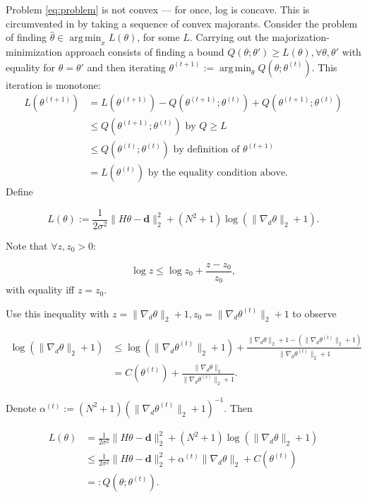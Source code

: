 \documentclass[paper=a4, fontsize=11pt]{scrartcl} %
\DeclareMathOperator*{\argmin}{arg\,min}
\numberwithin{equation}{section} %
\numberwithin{figure}{section} %
\numberwithin{table}{section} %
\newcommand{\data}{\mathbf{d}}
\newcommand{\param}{\theta}
\newcommand{\grad}{\nabla_{d} }
\begin{document}
Problem \eqref{eq:problem} is not convex --- for once, log is concave.
This is circumvented in \cite{oliveira2009adaptive} by taking a
sequence of convex majorants.  Consider the problem of finding
$\hat{\param} \in \argmin_{x} L(\param)$, for some $L$. Carrying out
the majorization-minimization approach consists of finding a bound
$Q(\param; \param') \geq L(\param), \forall \param,\param'$ with
equality for $\param=\param'$ and then iterating $\param^{(t+1)} :=
\argmin_{\param} Q(\param;\param^{(t)})$. This iteration is monotone:
\begin{align*}
  L(\param^{(t+1)}) &= L(\param^{(t+1)}) - Q(\param^{(t+1)}; \param^{(t)}) + Q(\param^{(t+1)}; \param^{(t)})\\
  &\leq  Q(\param^{(t+1)}; \param^{(t)}) \text{ by } Q \geq L \\
  & \leq Q(\param^{(t)} ;\param^{(t)}) \text{ by definition of } \param^{(t+1)} \\
  &= L(\param^{(t)}) \text{ by the equality condition above. }
\end{align*}
Define 

$$
L(\param) :=\frac{1}{2\sigma^2} \|H\param - \data\|_2^2 + (N^2 + 1) \log (\|\grad\param\|_2 + 1).
$$

Note that $\forall z,z_0 > 0$:

$$
\log z \leq \log z_0 + \frac{z-z_0}{z_0},
$$ 
with equality iff $z = z_0$.

Use this inequality with $z = \|\grad\param\|_2 + 1, z_0 = \|\grad
\param^{(t)}\|_2 + 1$ to observe

\begin{align*}
  \log (\|\grad\param\|_2 + 1) &\leq \log( \|\grad \param^{(t)}\|_2 + 1 ) + 
  \frac{ \|\grad \param\|_2 + 1 - (\|\grad \param^{(t)}\|_2 + 1)}{\|\grad \param^{(t)}\|_2 + 1} \\
  &= C(\param^{(t)}) + \frac{ \|\grad \param\|_2 }{\|\grad \param^{(t)}\|_2 + 1}.
\end{align*}

Denote $\alpha^{(t)} := (N^2+1)( \|\grad\param^{(t)} \|_2 + 1 )^{-1}$. Then

\begin{align*}
  L(\param) &= \frac{1}{2\sigma^2} \|H\param - \data\|_2^2 + (N^2 + 1) \log (\|\grad\param\|_2 + 1) \\ 
  &\leq \frac{1}{2\sigma^2} \|H\param - \data\|_2^2 + \alpha^{(t)} \|\grad \param\|_2   + C(\param^{(t)})\\
  &=: Q(\param ; \param^{(t)}).
\end{align*}
\end{document}
